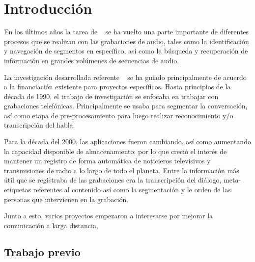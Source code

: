 
\chapter{Introducción}\label{ch:chap1}

En los últimos años la tarea de \SD~ se ha vuelto una parte importante de diferentes procesos que se realizan con las grabaciones de audio, tales como la identificación y navegación de segmentos en específico, así como la búsqueda y recuperación de información en grandes volúmenes de secuencias de audio.

La investigación desarrollada referente \sd~ se ha guiado principalmente de acuerdo a la financiación existente para proyectos específicos. Hasta principios de la década de 1990, el trabajo de investigación se enfocaba  en trabajar con grabaciones telefónicas. Principalmente se usaba para segmentar la conversación, así como etapa de pre-procesamiento para luego realizar reconocimiento y/o transcripción del habla.

Para la década del 2000, las aplicaciones fueron cambiando, así como aumentando la capacidad disponible de almacenamiento; por lo que creció el interés de mantener un registro de forma automática de noticieros televisivos  y transmisiones de radio a lo largo de todo el planeta. Entre la información más útil que se registraba de las grabaciones era la transcripción del diálogo, meta-etiquetas referentes al contenido así como la segmentación y le orden de las personas que intervienen en la grabación.

Junto a esto, varios proyectos empezaron a interesarse por mejorar la comunicación a larga distancia,


\section{Trabajo previo}
\label{sec:sota}
